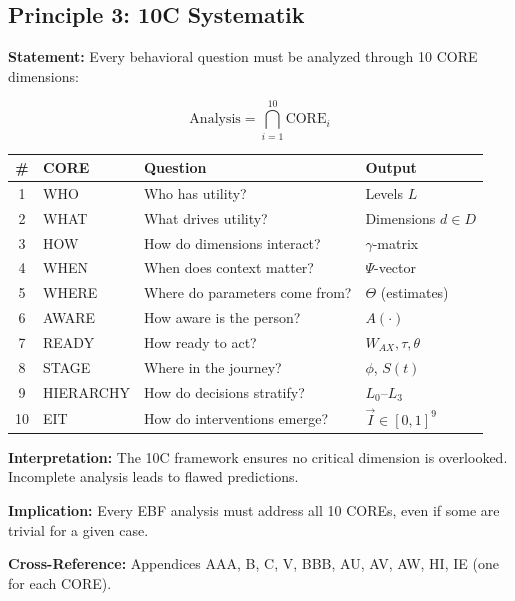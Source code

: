 \subsection{Principle 3: 10C Systematik}

\begin{tcolorbox}[colback=gray!5!white, colframe=gray!75!black,
    title=Axiom UNMAPPED_PR-3: Systematic 10C Analysis]

\textbf{Statement:} Every behavioral question must be analyzed through 10 CORE dimensions:

\begin{equation}
\text{Analysis} = \bigcap_{i=1}^{10} \text{CORE}_i
\end{equation}

\begin{table}[H]
\centering
\renewcommand{\arraystretch}{1.2}
\begin{tabular}{@{}clll@{}}
\toprule
\textbf{\#} & \textbf{CORE} & \textbf{Question} & \textbf{Output} \\
\midrule
1 & WHO & Who has utility? & Levels $L$ \\
2 & WHAT & What drives utility? & Dimensions $d \in D$ \\
3 & HOW & How do dimensions interact? & $\gamma$-matrix \\
4 & WHEN & When does context matter? & $\Psi$-vector \\
5 & WHERE & Where do parameters come from? & $\Theta$ (estimates) \\
6 & AWARE & How aware is the person? & $A(\cdot)$ \\
7 & READY & How ready to act? & $W_{AX}, \tau, \theta$ \\
8 & STAGE & Where in the journey? & $\phi$, $S(t)$ \\
9 & HIERARCHY & How do decisions stratify? & $L_0$--$L_3$ \\
10 & EIT & How do interventions emerge? & $\vec{I} \in [0,1]^9$ \\
\bottomrule
\end{tabular}
\end{table}

\textbf{Interpretation:} The 10C framework ensures no critical dimension is overlooked. Incomplete analysis leads to flawed predictions.

\textbf{Implication:} Every EBF analysis must address all 10 COREs, even if some are trivial for a given case.

\textbf{Cross-Reference:} Appendices AAA, B, C, V, BBB, AU, AV, AW, HI, IE (one for each CORE).

\end{tcolorbox}


